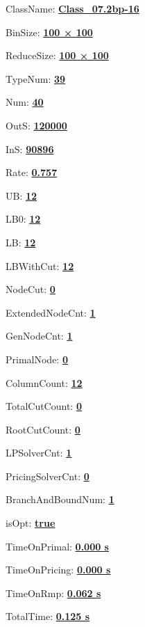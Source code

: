 \documentclass[11pt]{article}
\begin{document}
\pagestyle{empty}


ClassName: \underline{\textbf{Class_07.2bp-16}}
\par
BinSize: \underline{\textbf{100 × 100}}
\par
ReduceSize: \underline{\textbf{100 × 100}}
\par
TypeNum: \underline{\textbf{39}}
\par
Num: \underline{\textbf{40}}
\par
OutS: \underline{\textbf{120000}}
\par
InS: \underline{\textbf{90896}}
\par
Rate: \underline{\textbf{0.757}}
\par
UB: \underline{\textbf{12}}
\par
LB0: \underline{\textbf{12}}
\par
LB: \underline{\textbf{12}}
\par
LBWithCut: \underline{\textbf{12}}
\par
NodeCut: \underline{\textbf{0}}
\par
ExtendedNodeCnt: \underline{\textbf{1}}
\par
GenNodeCnt: \underline{\textbf{1}}
\par
PrimalNode: \underline{\textbf{0}}
\par
ColumnCount: \underline{\textbf{12}}
\par
TotalCutCount: \underline{\textbf{0}}
\par
RootCutCount: \underline{\textbf{0}}
\par
LPSolverCnt: \underline{\textbf{1}}
\par
PricingSolverCnt: \underline{\textbf{0}}
\par
BranchAndBoundNum: \underline{\textbf{1}}
\par
isOpt: \underline{\textbf{true}}
\par
TimeOnPrimal: \underline{\textbf{0.000 s}}
\par
TimeOnPricing: \underline{\textbf{0.000 s}}
\par
TimeOnRmp: \underline{\textbf{0.062 s}}
\par
TotalTime: \underline{\textbf{0.125 s}}
\par
\newpage


\end{document}
